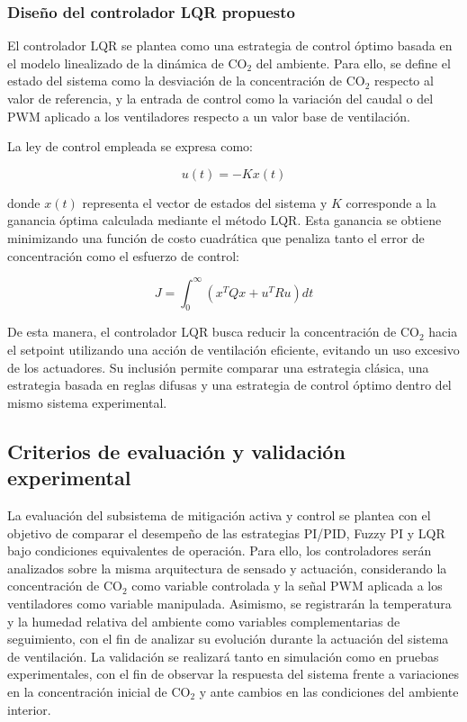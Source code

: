 \subsubsection{Diseño del controlador LQR propuesto}

El controlador LQR se plantea como una estrategia de control óptimo basada en el modelo linealizado de la dinámica de CO\(_2\) del ambiente. Para ello, se define el estado del sistema como la desviación de la concentración de CO\(_2\) respecto al valor de referencia, y la entrada de control como la variación del caudal o del PWM aplicado a los ventiladores respecto a un valor base de ventilación.

La ley de control empleada se expresa como:

\begin{equation}
    u(t) = -Kx(t)
\end{equation}

donde \(x(t)\) representa el vector de estados del sistema y \(K\) corresponde a la ganancia óptima calculada mediante el método LQR. Esta ganancia se obtiene minimizando una función de costo cuadrática que penaliza tanto el error de concentración como el esfuerzo de control:

\begin{equation}
    J = \int_0^\infty \left(x^TQx + u^TRu\right)dt
\end{equation}

De esta manera, el controlador LQR busca reducir la concentración de CO\(_2\) hacia el setpoint utilizando una acción de ventilación eficiente, evitando un uso excesivo de los actuadores. Su inclusión permite comparar una estrategia clásica, una estrategia basada en reglas difusas y una estrategia de control óptimo dentro del mismo sistema experimental.

\subsection{Criterios de evaluación y validación experimental}

La evaluación del subsistema de mitigación activa y control se plantea con el objetivo de comparar el desempeño de las estrategias PI/PID, Fuzzy PI y LQR bajo condiciones equivalentes de operación. Para ello, los controladores serán analizados sobre la misma arquitectura de sensado y actuación, considerando la concentración de CO$_2$ como variable controlada y la señal PWM aplicada a los ventiladores como variable manipulada. Asimismo, se registrarán la temperatura y la humedad relativa del ambiente como variables complementarias de seguimiento, con el fin de analizar su evolución durante la actuación del sistema de ventilación. La validación se realizará tanto en simulación como en pruebas experimentales, con el fin de observar la respuesta del sistema frente a variaciones en la concentración inicial de CO$_2$ y ante cambios en las condiciones del ambiente interior.

